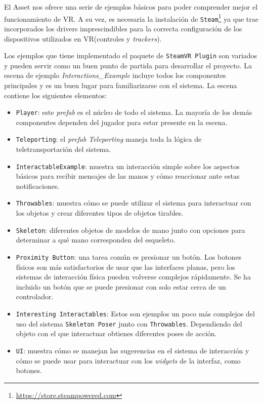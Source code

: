 El Asset nos ofrece una serie de ejemplos básicos para poder comprender mejor el funcionamiento de VR. A su vez, es necesaria la instalación de \texttt{Steam}\footnote{\url{ https://store.steampowered.com}} ya que trae incorporados los drivers imprescindibles para la correcta configuración de los dispositivos utilizados en VR(controles y \textit{trackers}).

Los ejemplos que tiene implementado el paquete de \texttt{SteamVR Plugin} son variados y pueden servir como un buen punto de partida para desarrollar el proyecto. La escena de ejemplo \textit{Interactions\_Example} incluye todos los componentes principales y es un buen lugar para familiarizarse con el sistema. La escena contiene los siguientes elementos:


\begin{itemize}
	\item \texttt{Player}: este \textit{prefab} es el núcleo de todo el sistema. La mayoría de los demás componentes dependen del jugador para estar presente en la escena.
    \item \texttt{Teleporting}: el \textit{prefab} \textit{Teleporting} maneja toda la lógica de teletransportación del sistema.
    \item \texttt{InteractableExample}: muestra un interacción simple sobre los aspectos básicos para recibir mensajes de las manos y cómo reaccionar ante estas notificaciones.
    \item \texttt{Throwables}: muestra cómo se puede utilizar el sistema para interactuar con los objetos y crear diferentes tipos de objetos tirables.
    \item \texttt{Skeleton}: diferentes objetos de modelos de mano junto con opciones para determinar a qué mano corresponden del esqueleto.
    \item \texttt{Proximity Button}: una tarea común es presionar un botón. Los botones físicos son más satisfactorios de usar que las interfaces planas, pero los sistemas de interacción física pueden volverse complejos rápidamente. Se ha incluido un botón que se puede presionar con solo estar cerca de un controlador.
    \item \texttt{Interesting Interactables}: Estos son ejemplos un poco más complejos del uso del sistema \texttt{Skeleton Poser} junto con \texttt{Throwables}. Dependiendo del objeto con el que interactuar obtienes diferentes poses de acción.
    \item \texttt{UI}: muestra cómo se manejan las sugerencias en el sistema de interacción y cómo se puede usar para interactuar con los \textit{widgets} de la interfaz, como botones.

\end{itemize}

